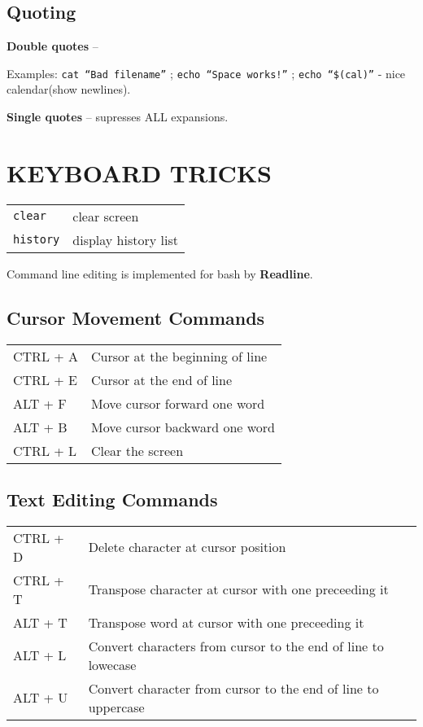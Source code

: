 \documentclass[8pt]{extarticle}
\begin{document}
\begin{multicols}{2}
\subsection{Quoting}

\textbf{Double quotes} – 

Examples: \texttt{cat “Bad filename”} ; \texttt{echo “Space works!”} ; \texttt{echo “\$(cal)”} - nice calendar(show newlines).

\textbf{Single quotes} – supresses ALL expansions.



\section{KEYBOARD TRICKS}

\begin{tabular}{ll}
	\texttt{clear} & clear screen\\
	\texttt{history} & display history list\\
\end{tabular}

Command line editing is implemented for bash by \textbf{Readline}.

\subsection{Cursor Movement Commands}
\begin{tabular}{ll}
	CTRL + A & Cursor at the beginning of line\\
	CTRL + E & Cursor at the end of line\\
	ALT + F & Move cursor forward one word\\
	ALT + B & Move cursor backward one word\\
	CTRL + L & Clear the screen
\end{tabular}

\subsection{Text Editing Commands}
\begin{tabular}{ll}
	CTRL + D & Delete character at cursor position\\
	CTRL + T & Transpose character at cursor with one preceeding it\\
	ALT + T & Transpose word at cursor with one preceeding it\\
	ALT + L & Convert characters from cursor to the end of line to lowecase\\
	ALT + U & Convert character from cursor to the end of line to uppercase
\end{tabular}


\end{multicols}
\end{document}
